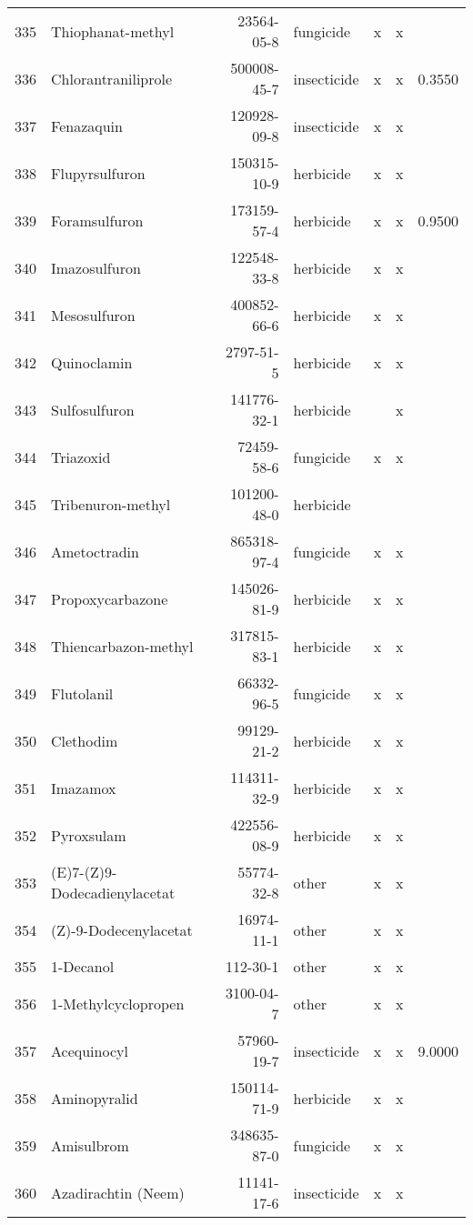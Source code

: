 \begin{longtable}{lp{3cm}rlp{0.5cm}p{0.5cm}p{1.5cm}}
  335 & Thiophanat-methyl & 23564-05-8 & fungicide & x & x &  \\ 
  336 & Chlorantraniliprole & 500008-45-7 & insecticide & x & x & 0.3550 \\ 
  337 & Fenazaquin & 120928-09-8 & insecticide & x & x &  \\ 
  338 & Flupyrsulfuron & 150315-10-9 & herbicide & x & x &  \\ 
  339 & Foramsulfuron & 173159-57-4 & herbicide & x & x & 0.9500 \\ 
  340 & Imazosulfuron & 122548-33-8 & herbicide & x & x &  \\ 
  341 & Mesosulfuron & 400852-66-6 & herbicide & x & x &  \\ 
  342 & Quinoclamin & 2797-51-5 & herbicide & x & x &  \\ 
  343 & Sulfosulfuron & 141776-32-1 & herbicide &  & x &  \\ 
  344 & Triazoxid & 72459-58-6 & fungicide & x & x &  \\ 
  345 & Tribenuron-methyl & 101200-48-0 & herbicide &  &  &  \\ 
  346 & Ametoctradin & 865318-97-4 & fungicide & x & x &  \\ 
  347 & Propoxycarbazone & 145026-81-9 & herbicide & x & x &  \\ 
  348 & Thiencarbazon-methyl & 317815-83-1 & herbicide & x & x &  \\ 
  349 & Flutolanil & 66332-96-5 & fungicide & x & x &  \\ 
  350 & Clethodim & 99129-21-2 & herbicide & x & x &  \\ 
  351 & Imazamox & 114311-32-9 & herbicide & x & x &  \\ 
  352 & Pyroxsulam & 422556-08-9 & herbicide & x & x &  \\ 
  353 & (E)7-(Z)9-Dodecadienylacetat & 55774-32-8 & other & x & x &  \\ 
  354 & (Z)-9-Dodecenylacetat & 16974-11-1 & other & x & x &  \\ 
  355 & 1-Decanol & 112-30-1 & other & x & x &  \\ 
  356 & 1-Methylcyclopropen & 3100-04-7 & other & x & x &  \\ 
  357 & Acequinocyl & 57960-19-7 & insecticide & x & x & 9.0000 \\ 
  358 & Aminopyralid & 150114-71-9 & herbicide & x & x &  \\ 
  359 & Amisulbrom & 348635-87-0 & fungicide & x & x &  \\ 
  360 & Azadirachtin (Neem) & 11141-17-6 & insecticide & x & x &  \\ 

\end{longtable}

